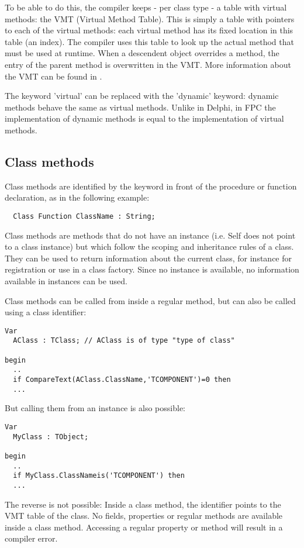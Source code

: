 To be able to do this, the compiler keeps - per class type - a table with
virtual methods: the VMT (Virtual Method Table). This is simply a table 
with pointers to each of the virtual methods: each virtual method has its
fixed location in this table (an index). The compiler uses this table to 
look up the actual method that must be used at runtime. When a descendent object
overrides a method, the entry of the parent method is overwritten in the
VMT. More information about the VMT can be found in \progref.

\begin{remark}
The keyword 'virtual' can be replaced with the 'dynamic' keyword: dynamic
methods behave the same as virtual methods. Unlike in Delphi, in FPC the
implementation of dynamic methods is equal to the implementation of virtual
methods.
\end{remark}

\subsection{Class methods}
Class methods are identified by the keyword  in front of the
procedure or function declaration, as in the following example:
\begin{verbatim}
  Class Function ClassName : String;
\end{verbatim}
Class methods are methods that do not have an instance (i.e. Self does not
point to a class instance) but which follow the scoping and inheritance 
rules of a class. They can be used to return information about the current
class, for instance for registration or use in a class factory. Since no 
instance is available, no information available in instances can be used.

Class methods can be called from inside a regular method, but can also be called 
using a class identifier:
\begin{verbatim}
Var
  AClass : TClass; // AClass is of type "type of class"

begin
  ..
  if CompareText(AClass.ClassName,'TCOMPONENT')=0 then
  ...

\end{verbatim}
But calling them from an instance is also possible:
\begin{verbatim}
Var
  MyClass : TObject;

begin
  ..
  if MyClass.ClassNameis('TCOMPONENT') then
  ...
\end{verbatim}
The reverse is not possible: Inside a class method, the  identifier 
points to the VMT table of the class. No fields, properties or 
regular methods are available inside a class method. Accessing a regular 
property or method will result in a compiler error. 

